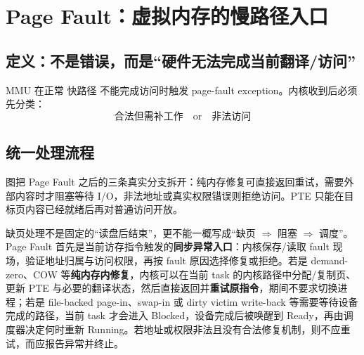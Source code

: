 \documentclass[11pt,a4paper]{ctexart}
\newcommand{\kw}[1]{\textbf{#1}}
\begin{document}
\section{Page Fault：虚拟内存的慢路径入口}

\subsection{定义：不是错误，而是“硬件无法完成当前翻译/访问”}
MMU 在正常 快路径 不能完成访问时触发 page-fault exception。内核收到后必须先分类：
\[
\boxed{
\text{合法但需补工作}
\quad\text{or}\quad
\text{非法访问}
}
\]

\subsection{统一处理流程}
\begin{center}
\resizebox{0.96\linewidth}{!}{}
\end{center}
图把 Page Fault 之后的三条真实分支拆开：纯内存修复可直接返回重试，需要外部内容时才阻塞等待 I/O，非法地址或真实权限错误则拒绝访问。PTE 只能在目标页内容已经就绪后再对普通访问开放。

缺页处理不是固定的“读盘后结束”，更不能一概写成“缺页 $\Rightarrow$ 阻塞 $\Rightarrow$ 调度”。Page Fault 首先是当前访存指令触发的\kw{同步异常入口}：内核保存/读取 fault 现场，验证地址归属与访问权限，再按 fault 原因选择修复或拒绝。若是 demand-zero、COW 等\kw{纯内存内修复}，内核可以在当前 task 的内核路径中分配/复制页、更新 PTE 与必要的翻译状态，然后直接返回并\kw{重试原指令}，期间不要求切换进程；若是 file-backed page-in、swap-in 或 dirty victim write-back 等需要等待设备完成的路径，当前 task 才会进入 Blocked，设备完成后被唤醒到 Ready，再由调度器决定何时重新 Running。若地址或权限非法且没有合法修复机制，则不应重试，而应报告异常并终止。
\end{document}
